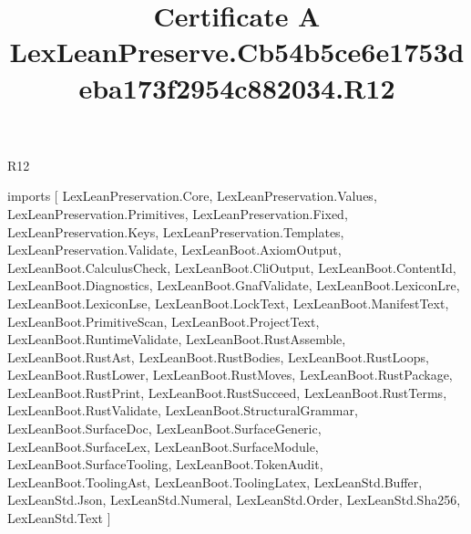 \begin{lexlean}{R12}
\title{Certificate A LexLeanPreserve.Cb54b5ce6e1753deba173f2954c882034.R12}
\begin{coremodule}
imports [
  LexLeanPreservation.Core,
  LexLeanPreservation.Values,
  LexLeanPreservation.Primitives,
  LexLeanPreservation.Fixed,
  LexLeanPreservation.Keys,
  LexLeanPreservation.Templates,
  LexLeanPreservation.Validate,
  LexLeanBoot.AxiomOutput,
  LexLeanBoot.CalculusCheck,
  LexLeanBoot.CliOutput,
  LexLeanBoot.ContentId,
  LexLeanBoot.Diagnostics,
  LexLeanBoot.GnafValidate,
  LexLeanBoot.LexiconLre,
  LexLeanBoot.LexiconLse,
  LexLeanBoot.LockText,
  LexLeanBoot.ManifestText,
  LexLeanBoot.PrimitiveScan,
  LexLeanBoot.ProjectText,
  LexLeanBoot.RuntimeValidate,
  LexLeanBoot.RustAssemble,
  LexLeanBoot.RustAst,
  LexLeanBoot.RustBodies,
  LexLeanBoot.RustLoops,
  LexLeanBoot.RustLower,
  LexLeanBoot.RustMoves,
  LexLeanBoot.RustPackage,
  LexLeanBoot.RustPrint,
  LexLeanBoot.RustSucceed,
  LexLeanBoot.RustTerms,
  LexLeanBoot.RustValidate,
  LexLeanBoot.StructuralGrammar,
  LexLeanBoot.SurfaceDoc,
  LexLeanBoot.SurfaceGeneric,
  LexLeanBoot.SurfaceLex,
  LexLeanBoot.SurfaceModule,
  LexLeanBoot.SurfaceTooling,
  LexLeanBoot.TokenAudit,
  LexLeanBoot.ToolingAst,
  LexLeanBoot.ToolingLatex,
  LexLeanStd.Buffer,
  LexLeanStd.Json,
  LexLeanStd.Numeral,
  LexLeanStd.Order,
  LexLeanStd.Sha256,
  LexLeanStd.Text
]


\end{coremodule}
\end{lexlean}
